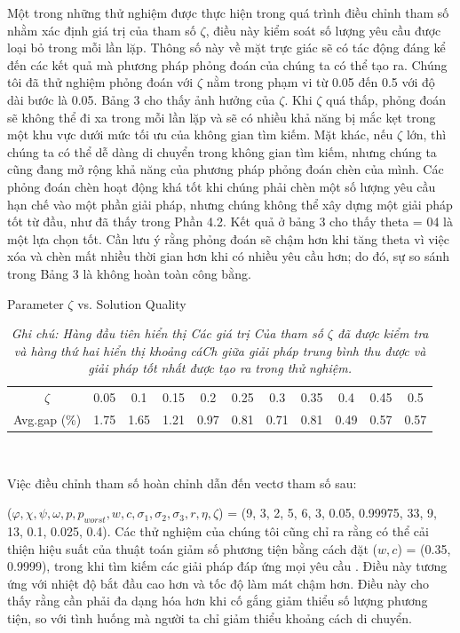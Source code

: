 Một trong những thử nghiệm được thực hiện trong quá trình điều chỉnh tham số nhằm xác định giá trị của tham số $\zeta$, điều này kiểm soát số lượng yêu cầu được loại bỏ trong mỗi lần lặp. Thông số này về mặt trực giác sẽ có tác động đáng kể đến các kết quả mà phương pháp phỏng đoán của chúng ta có thể tạo ra. Chúng tôi đã thử nghiệm phỏng đoán với $\zeta$ nằm trong phạm vi từ 0.05 đến 0.5 với độ dài bước là 0.05. Bảng 3 cho thấy ảnh hưởng của $\zeta$.  Khi $\zeta$ quá thấp, phỏng đoán sẽ không thể đi xa trong mỗi lần lặp và sẽ có nhiều khả năng bị mắc kẹt trong một khu vực dưới mức tối ưu của không gian tìm kiếm. Mặt khác, nếu $\zeta$ lớn, thì chúng ta có thể dễ dàng di chuyển trong không gian tìm kiếm, nhưng chúng ta cũng đang mở rộng khả năng của phương pháp phỏng đoán chèn của mình. Các phỏng đoán chèn hoạt động khá tốt khi chúng phải chèn một số lượng yêu cầu hạn chế vào một phần giải pháp, nhưng chúng không thể xây dựng một giải pháp tốt từ đầu, như đã thấy trong Phần 4.2. Kết quả ở bảng 3 cho thấy theta = 04 là một lựa chọn tốt. Cần lưu ý rằng phỏng đoán sẽ chậm hơn khi tăng theta vì việc xóa và chèn mất nhiều thời gian hơn khi có nhiều yêu cầu hơn; do đó, sự so sánh trong Bảng 3 là không hoàn toàn công bằng.


\begin{table}
    \caption[]{Parameter $\zeta$ vs. Solution Quality}
    \begin{tabular}{c c c c c c c c c c c} 
        \hline
        $\zeta$ & 0.05 & 0.1 & 0.15 & 0.2 & 0.25 & 0.3 & 0.35 & 0.4 & 0.45 & 0.5 \\
        Avg.gap (\%) & 1.75 & 1.65 & 1.21 & 0.97 & 0.81 & 0.71 & 0.81 & 0.49 & 0.57 & 0.57 \\ [1ex]
        \hline 
    \end{tabular}
    \\ [1ex]
    \caption*{ \textit{Ghi chú: Hàng đầu tiên hiển thị Các giá trị Của tham số $\zeta$ đã được kiểm tra và hàng thứ hai hiển thị khoảng cáCh giữa giải pháp trung bình thu được và giải pháp tốt nhất được tạo ra trong thử nghiệm.}}   
\end{table}

Việc điều chỉnh tham số hoàn chỉnh dẫn đến vectơ tham số sau:

($\varphi, \chi, \psi, \omega, p,  p_{worst}, w, c, \sigma_1, \sigma_2, \sigma_3, r, \eta, \zeta$) = (9, 3, 2, 5, 6, 3, 0.05, 0.99975, 33, 9, 13, 0.1, 0.025, 0.4). Các thử nghiệm của chúng tôi cũng chỉ ra rằng có thể cải thiện hiệu suất của thuật toán giảm số phương tiện bằng cách đặt ($w,c$)  = (0.35, 0.9999), trong khi tìm kiếm các giải pháp đáp ứng mọi yêu cầu . Điều này tương ứng với nhiệt độ bắt đầu cao hơn và tốc độ làm mát chậm hơn. Điều này cho thấy rằng cần phải đa dạng hóa hơn khi cố gắng giảm thiểu số lượng phương tiện, so với tình huống mà người ta chỉ giảm thiểu khoảng cách di chuyển.

